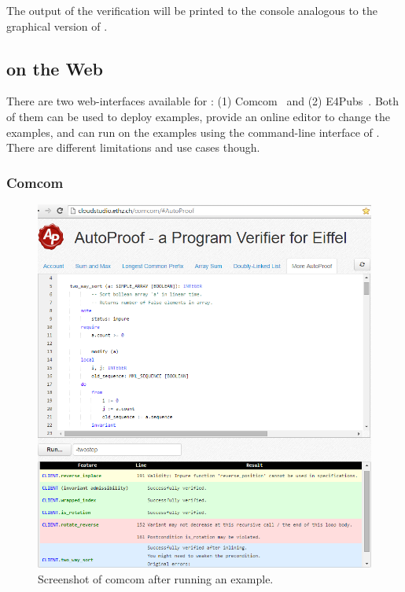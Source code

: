 The output of the verification will be printed to the console analogous to the graphical version of \AutoProof.


\subsection{\AutoProof on the Web}\label{sec:ap:webui}

There are two web-interfaces available for \AutoProof: (1) Comcom~\cite{APCOMCOM} and (2) E4Pubs~\cite{APE4PUBS}. Both of them can be used to deploy examples, provide an online editor to change the examples, and can run \AutoProof on the examples using the command-line interface of \AutoProof. There are different limitations and use cases though.

\subsubsection{Comcom}

\begin{figure}[p]
\centering
\includegraphics[width=\columnwidth]{images/comcom_screenshot.png}
\caption{Screenshot of comcom after running an example.}
\label{fig:ap-comcom}
\end{figure}

